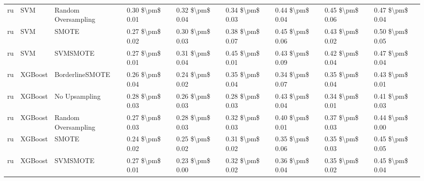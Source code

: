 \begin{tabular}{lllllllll}
      ru &                             SVM &           Random Oversampling & 0.30 \$\textbackslash pm\$ 0.01 &           0.32 \$\textbackslash pm\$ 0.04 &       0.34 \$\textbackslash pm\$ 0.03 &        0.44 \$\textbackslash pm\$ 0.04 &                         0.45 \$\textbackslash pm\$ 0.06 &     0.47 \$\textbackslash pm\$ 0.04 \\
      ru &                             SVM &                         SMOTE & 0.27 \$\textbackslash pm\$ 0.02 &           0.30 \$\textbackslash pm\$ 0.03 &       0.38 \$\textbackslash pm\$ 0.07 &        0.45 \$\textbackslash pm\$ 0.06 &                         0.43 \$\textbackslash pm\$ 0.02 &     0.50 \$\textbackslash pm\$ 0.05 \\
      ru &                             SVM &                      SVMSMOTE & 0.27 \$\textbackslash pm\$ 0.01 &           0.31 \$\textbackslash pm\$ 0.04 &       0.45 \$\textbackslash pm\$ 0.01 &        0.43 \$\textbackslash pm\$ 0.09 &                         0.42 \$\textbackslash pm\$ 0.04 &     0.47 \$\textbackslash pm\$ 0.04 \\
      ru &                         XGBoost &               BorderlineSMOTE & 0.26 \$\textbackslash pm\$ 0.04 &           0.24 \$\textbackslash pm\$ 0.02 &       0.35 \$\textbackslash pm\$ 0.04 &        0.34 \$\textbackslash pm\$ 0.07 &                         0.35 \$\textbackslash pm\$ 0.04 &     0.43 \$\textbackslash pm\$ 0.01 \\
      ru &                         XGBoost &                 No Upsampling & 0.28 \$\textbackslash pm\$ 0.03 &           0.26 \$\textbackslash pm\$ 0.03 &       0.28 \$\textbackslash pm\$ 0.03 &        0.43 \$\textbackslash pm\$ 0.04 &                         0.34 \$\textbackslash pm\$ 0.01 &     0.41 \$\textbackslash pm\$ 0.03 \\
      ru &                         XGBoost &           Random Oversampling & 0.27 \$\textbackslash pm\$ 0.03 &           0.28 \$\textbackslash pm\$ 0.03 &       0.32 \$\textbackslash pm\$ 0.03 &        0.40 \$\textbackslash pm\$ 0.01 &                         0.37 \$\textbackslash pm\$ 0.03 &     0.44 \$\textbackslash pm\$ 0.00 \\
      ru &                         XGBoost &                         SMOTE & 0.24 \$\textbackslash pm\$ 0.02 &           0.25 \$\textbackslash pm\$ 0.02 &       0.31 \$\textbackslash pm\$ 0.02 &        0.35 \$\textbackslash pm\$ 0.06 &                         0.35 \$\textbackslash pm\$ 0.03 &     0.45 \$\textbackslash pm\$ 0.05 \\
      ru &                         XGBoost &                      SVMSMOTE & 0.27 \$\textbackslash pm\$ 0.01 &           0.23 \$\textbackslash pm\$ 0.00 &       0.32 \$\textbackslash pm\$ 0.02 &        0.36 \$\textbackslash pm\$ 0.04 &                         0.35 \$\textbackslash pm\$ 0.02 &     0.45 \$\textbackslash pm\$ 0.04 \\
\bottomrule
\end{tabular}
